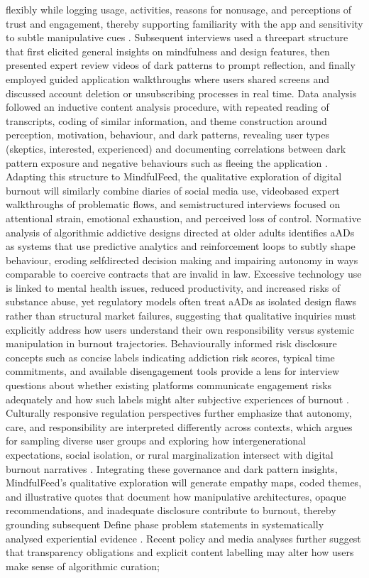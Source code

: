 \documentclass{article}
\begin{document}
flexibly while logging usage, activities, reasons for non\-usage, and perceptions of trust and engagement, thereby supporting familiarity with the app and sensitivity to subtle manipulative cues \parencites[4]{7173856}. Subsequent interviews used a three\-part structure that first elicited general insights on mindfulness and design features, then presented expert review videos of dark patterns to prompt reflection, and finally employed guided application walkthroughs where users shared screens and discussed account deletion or unsubscribing processes in real time. Data analysis followed an inductive content analysis procedure, with repeated reading of transcripts, coding of similar information, and theme construction around perception, motivation, behaviour, and dark patterns, revealing user types (skeptics, interested, experienced) and documenting correlations between dark pattern exposure and negative behaviours such as fleeing the application \parencites[5]{7173856}. Adapting this structure to MindfulFeed, the qualitative exploration of digital burnout will similarly combine diaries of social media use, video\-based expert walkthroughs of problematic flows, and semi\-structured interviews focused on attentional strain, emotional exhaustion, and perceived loss of control. Normative analysis of algorithmic addictive designs directed at older adults identifies aADs as systems that use predictive analytics and reinforcement loops to subtly shape behaviour, eroding self\-directed decision making and impairing autonomy in ways comparable to coercive contracts that are invalid in law. Excessive technology use is linked to mental health issues, reduced productivity, and increased risks of substance abuse, yet regulatory models often treat aADs as isolated design flaws rather than structural market failures, suggesting that qualitative inquiries must explicitly address how users understand their own responsibility versus systemic manipulation in burnout trajectories. Behaviourally informed risk disclosure concepts such as concise labels indicating addiction risk scores, typical time commitments, and available disengagement tools provide a lens for interview questions about whether existing platforms communicate engagement risks adequately and how such labels might alter subjective experiences of burnout \parencites[4]{4590567}. Culturally responsive regulation perspectives further emphasize that autonomy, care, and responsibility are interpreted differently across contexts, which argues for sampling diverse user groups and exploring how intergenerational expectations, social isolation, or rural marginalization intersect with digital burnout narratives \parencites[5]{4590567}. Integrating these governance and dark pattern insights, MindfulFeed's qualitative exploration will generate empathy maps, coded themes, and illustrative quotes that document how manipulative architectures, opaque recommendations, and inadequate disclosure contribute to burnout, thereby grounding subsequent Define phase problem statements in systematically analysed experiential evidence \parencites[2]{4807303}[2]{2668071}[7]{7808872}[5]{7173856}. Recent policy and media analyses further suggest that transparency obligations and explicit content labelling may alter how users make sense of algorithmic curation; 
\end{document}
